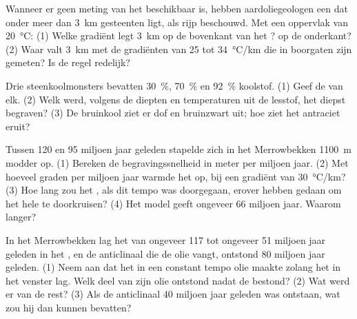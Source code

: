 \begin{exercise}[$\star\star$]\label{exo:g11:fossil-fuel-geology:10}
Wanneer er geen meting van het  beschikbaar is, hebben aardoliegeologen een
 dat onder meer dan \qty{3}{km} gesteenten ligt, als rijp beschouwd.
Met een oppervlak van \qty{20}{\degreeCelsius}: (1) Welke gradiënt legt
\qty{3}{km} op de bovenkant van het ? op de onderkant? (2) Waar valt
\qty{3}{km} met de gradiënten van 25 tot \qty{34}{\degreeCelsius/km} die in boorgaten zijn gemeten?
Is de regel redelijk?
\end{exercise}

\begin{exercise}[$\star\star$]\label{exo:g11:fossil-fuel-geology:11}
Drie steenkoolmonsters bevatten \qty{30}{\percent}, \qty{70}{\percent} en
\qty{92}{\percent} koolstof. (1) Geef de  van elk. (2) Welk werd, volgens de
diepten en temperaturen uit de lesstof, het diepst begraven?
(3) De bruinkool ziet er dof en bruinzwart uit; hoe ziet het antraciet eruit?
\end{exercise}

\begin{exercise}[$\star\star\star$]\label{exo:g11:fossil-fuel-geology:12}
Tussen 120 en 95 miljoen jaar geleden stapelde zich in het Merrowbekken \qty{1100}{m} modder
op. (1) Bereken de begravingssnelheid in meter per miljoen jaar.
(2) Met hoeveel graden per miljoen jaar warmde het  op, bij een gradiënt van
\qty{30}{\degreeCelsius/km}? (3) Hoe lang zou het , als dit tempo
was doorgegaan, erover hebben gedaan om het hele  te doorkruisen? (4) Het
model geeft ongeveer 66 miljoen jaar. Waarom langer?
\end{exercise}

\begin{exercise}[$\star\star\star$]\label{exo:g11:fossil-fuel-geology:13}
In het Merrowbekken lag het  van ongeveer 117
tot ongeveer 51 miljoen jaar geleden in het , en de anticlinaal die de olie vangt, ontstond
80 miljoen jaar geleden. (1) Neem aan dat het  in een constant tempo olie maakte
zolang het in het venster lag. Welk deel van zijn olie ontstond nadat de 
bestond? (2) Wat werd er van de rest? (3) Als de anticlinaal 40
miljoen jaar geleden was ontstaan, wat zou hij dan kunnen bevatten?
\end{exercise}


